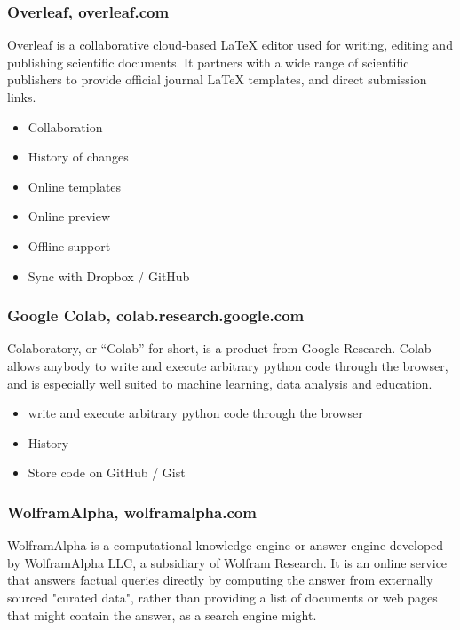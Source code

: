 \subsubsection{Overleaf, overleaf.com}

{Overleaf is a collaborative cloud-based LaTeX editor used for writing, editing and publishing scientific documents. It partners with a wide range of scientific publishers to provide official journal LaTeX templates, and direct submission links.}

\begin{itemize}
\item
  {Collaboration}
\item
  {History of changes}
\item
  {Online templates}
\item
  {Online preview}
\item
  {Offline support}
\item
  {Sync with Dropbox / GitHub}
\end{itemize}

\subsubsection{Google Colab, colab.research.google.com}

{Colaboratory, or ``Colab'' for short, is a product from Google Research. Colab allows anybody to write and execute arbitrary python code through the browser, and is especially well suited to machine learning, data analysis and education.}

\begin{itemize}
\item
  {write and execute arbitrary python code through the browser}
\item
  {History}
\item
  {Store code on GitHub / Gist}
\end{itemize}

\subsubsection{WolframAlpha, wolframalpha.com}

{WolframAlpha is a computational knowledge engine or answer engine developed by WolframAlpha LLC, a subsidiary of Wolfram Research. It is an online service that answers factual queries directly by computing the answer from externally sourced "curated data", rather than providing a list of documents or web pages that might contain the answer, as a search engine might.}

